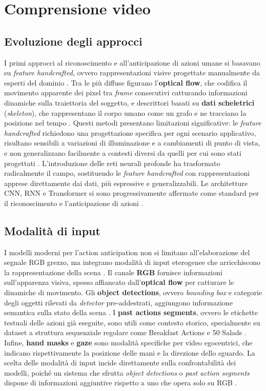 \section{Comprensione video}
\subsection{Evoluzione degli approcci}
I primi approcci al riconoscimento e all'anticipazione di azioni umane si basavano su \textit{feature handcrafted}, ovvero rappresentazioni visive progettate manualmente da esperti del dominio \cite{hu2022online}. Tra le più diffuse figurano l'\textbf{optical flow}, che codifica il movimento apparente dei pixel tra \textit{frame} consecutivi catturando informazioni dinamiche sulla traiettoria del soggetto, e descrittori basati su \textbf{dati scheletrici} (\textit{skeleton}), che rappresentano il corpo umano come un grafo e ne tracciano la posizione nel tempo \cite{hu2022online}. Questi metodi presentano limitazioni significative: le \textit{feature handcrafted} richiedono una progettazione specifica per ogni scenario applicativo, risultano sensibili a variazioni di illuminazione e a cambiamenti di punto di vista, e non generalizzano facilmente a contesti diversi da quelli per cui sono stati progettati \cite{hu2022online, lai2024human}.
L'introduzione delle reti neurali profonde ha trasformato radicalmente il campo, sostituendo le \textit{feature handcrafted} con rappresentazioni apprese direttamente dai dati, più espressive e generalizzabili. Le architetture CNN, RNN e Transformer si sono progressivamente affermate come standard per il riconoscimento e l'anticipazione di azioni \cite{lai2024human}.
\subsection{Modalità di input}
I modelli moderni per l'action anticipation non si limitano all'elaborazione del segnale RGB grezzo, ma integrano modalità di input eterogenee che arricchiscono la rappresentazione della scena \cite{lai2024human}. Il canale \textbf{RGB} fornisce informazioni sull'apparenza visiva, spesso affiancato dall'\textbf{optical flow} per catturare le dinamiche di movimento. Gli \textbf{object detections}, ovvero \textit{bounding box} e categorie degli oggetti rilevati da \textit{detector} pre-addestrati, aggiungono informazione semantica sulla stato della scena \cite{lai2024human}. I \textbf{past actions segments}, ovvero le etichette testuali delle azioni già eseguite, sono utili come contesto storico, specialmente su dataset a struttura sequenziale regolare come Breakfast Actions e 50 Salads \cite{sener2020temporal}. Infine, \textbf{hand masks} e \textbf{gaze} sono modalità specifiche per video egocentrici, che indicano rispettivamente la posizione delle mani e la direzione dello sguardo. La scelta delle modalità di input incide direttamente sulla confrontabilità dei modelli, poiché un sistema che sfrutta \textit{object detections} o \textit{past action segments} dispone di informazioni aggiuntive rispetto a uno che opera solo su RGB \cite{lai2024human}.
